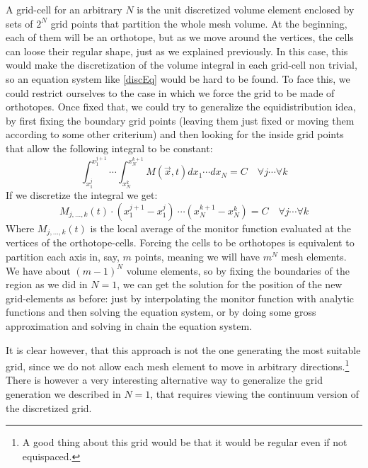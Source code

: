 \documentclass[11pt, a4paper]{article} %
\begin{document}
A grid-cell for an arbitrary $N$ is the unit discretized volume element enclosed by sets of $2^N$ grid points that partition the whole mesh volume. At the beginning, each of them will be an orthotope, but as we move around the vertices, the cells can loose their regular shape, just as we explained previously. In this case, this would make the discretization of the volume integral in each grid-cell non trivial, so an equation system like \eqref{discEq} would be hard to be found. To face this, we could restrict ourselves to the case in which we force the grid to be made of orthotopes. Once fixed that, we could try to generalize the equidistribution idea, by first fixing the boundary grid points (leaving them just fixed or moving them according to some other criterium) and then looking for the inside grid points that allow the following integral to be constant:
\begin{equation}
\int_{x_1^j}^{x_1^{j+1}}\cdots \int_{x_N^k}^{x_N^{k+1}} M(\vec{x},t) dx_1 \cdots dx_N=C \quad \forall j\cdots \forall k
\end{equation}
If we discretize the integral we get:
\begin{equation}\label{monitor}
 M_{j,...,k}(t)\cdot (x_1^{j+1}-x_1^j)\ \cdots (x_N^{k+1}-x_N^k) =C \quad \forall j\cdots \forall k
\end{equation}
Where $M_{j,...,k}(t)$ is the local average of the monitor function evaluated at the vertices of the orthotope-cells. Forcing the cells to be orthotopes is equivalent to partition each axis in, say, $m$ points, meaning we will have $m^N$ mesh elements. We have about $(m-1)^N$ volume elements, so by fixing the boundaries of the region as we did in $N=1$, we can get the solution for the position of the new grid-elements as before: just by interpolating the monitor function with analytic functions and then solving the equation system, or by doing some gross approximation and solving in chain the equation system.

It is clear however, that this approach is not the one generating the most suitable grid, since we do not allow each mesh element to move in arbitrary directions.\footnote{ A good thing about this grid would be that it would be regular even if not equispaced.} There is however a very interesting alternative way to generalize the grid generation we described in $N=1$, that requires viewing the continuum version of the discretized grid.

\end{document}
